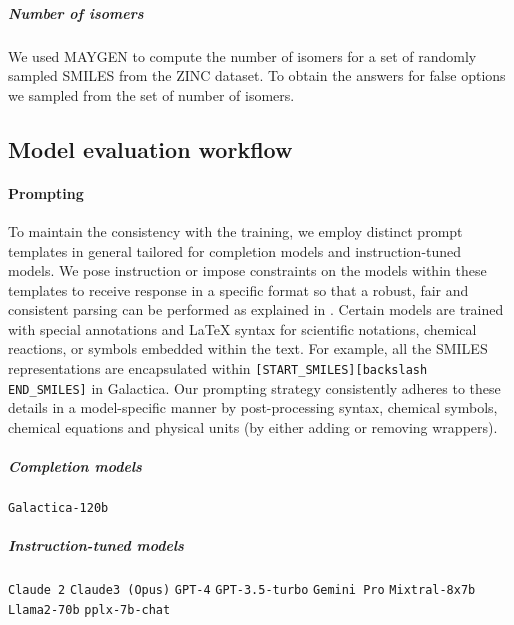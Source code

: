 \documentclass[11pt, oneside]{article}
\begin{document}
\subparagraph{Number of isomers}
We used MAYGEN\cite{Yirik_2021} to compute the number of isomers for a set of randomly sampled SMILES from the ZINC dataset.
To obtain the answers for false options we sampled from the set of number of isomers.

\subsection{Model evaluation workflow}

\paragraph{Prompting}

To maintain the consistency with the training, we employ distinct prompt templates in general tailored for completion models and instruction-tuned models. 
We pose instruction or impose constraints on the models within these templates to receive response in a specific format so that a robust, fair and consistent parsing can be performed as explained in .
Certain models are trained with special annotations and LaTeX syntax for scientific notations, chemical reactions, or symbols embedded within the text. 
For example, all the SMILES representations are encapsulated within \texttt{[START_SMILES][\text backslash END_SMILES]} in Galactica\cite{taylor2022galactica}.
Our prompting strategy consistently adheres to  these details in a model-specific manner by post-processing \latex syntax, chemical symbols, chemical equations and physical units (by either adding or removing wrappers).

\subparagraph{Completion models}
\texttt{Galactica-120b}\cite{taylor2022galactica}


\subparagraph{Instruction-tuned models} \texttt{Claude 2} \texttt{Claude3 (Opus)}\cite{anthropicClaudeModelFamily2024}
\texttt{GPT-4}\cite{openai2024gpt4}
\texttt{GPT-3.5-turbo}\cite{brown2020language}
\texttt{Gemini Pro}\cite{gemini}
\texttt{Mixtral-8x7b}\cite{jiang2024mixtral}
\texttt{Llama2-70b}\cite{touvron2023llama}
\texttt{pplx-7b-chat}
\end{document}
